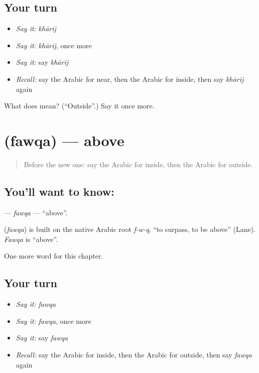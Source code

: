 \subsection*{Your turn}
\begin{itemize}
\raggedright
  \item \emph{Say it:} \emph{khārij}
  \item \emph{Say it:} \emph{khārij}, once more
  \item \emph{Say it:} say \emph{khārij}
  \item \emph{Recall:} say the Arabic for near, then the Arabic for inside, then say \emph{khārij} again
\end{itemize}

\begin{tcolorbox}[breakable,colback=teal!4,colframe=teal!35!black,title={Before you move on}]
What does  mean? (\textquotedblleft{}Outside\textquotedblright{}.) Say it once more.
\end{tcolorbox}
\section[\texorpdfstring{\ar{فوق} (fawqa)}{فوق (fawqa)}]{ (fawqa) — above}

\label{lesson:AR-C89-fawqa}



\begin{quote}
Before the new one: say the Arabic for inside, then the Arabic for outside.
\end{quote}

\subsection*{You'll want to know: }
\textbf{} — \emph{fawqa} — \textquotedblleft{}above\textquotedblright{}.

\begin{cousinweb}
\textbf{} (\emph{fawqa}) is built on the native Arabic root \emph{f-w-q}, \textquotedblleft{}to surpass, to be above\textquotedblright{} (Lane). \emph{Fawqa} is \textquotedblleft{}above\textquotedblright{}.
\end{cousinweb}

\begin{grammarlens}[title={What you've built}]
One more word for this chapter.
\end{grammarlens}

\subsection*{Your turn}
\begin{itemize}
\raggedright
  \item \emph{Say it:} \emph{fawqa}
  \item \emph{Say it:} \emph{fawqa}, once more
  \item \emph{Say it:} say \emph{fawqa}
  \item \emph{Recall:} say the Arabic for inside, then the Arabic for outside, then say \emph{fawqa} again
\end{itemize}

